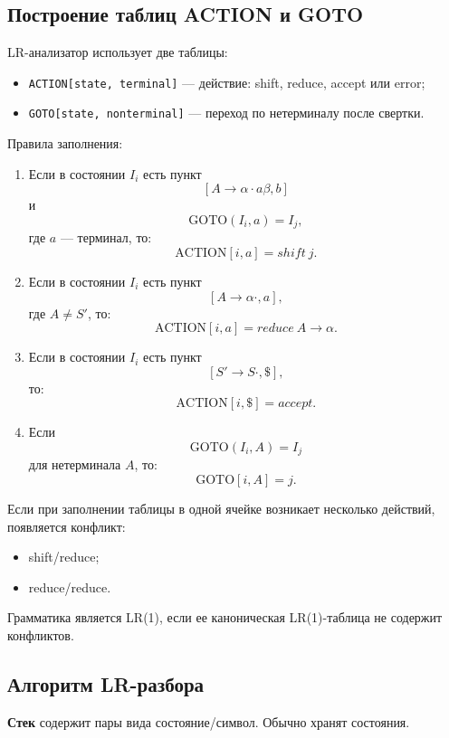 \documentclass[12pt,a4paper]{article}
\begin{document}
\subsection{Построение таблиц ACTION и GOTO}

LR-анализатор использует две таблицы:

\begin{itemize}
    \item \texttt{ACTION[state, terminal]} --- действие: shift, reduce, accept или error;
    \item \texttt{GOTO[state, nonterminal]} --- переход по нетерминалу после свертки.
\end{itemize}

Правила заполнения:

\begin{enumerate}
    \item Если в состоянии $I_i$ есть пункт
    \[
    [A \to \alpha \cdot a\beta, b]
    \]
    и
    \[
    \mathrm{GOTO}(I_i,a)=I_j,
    \]
    где $a$ --- терминал, то:
    \[
    \mathrm{ACTION}[i,a]=shift\ j.
    \]
    \item Если в состоянии $I_i$ есть пункт
    \[
    [A \to \alpha \cdot, a],
    \]
    где $A\ne S'$, то:
    \[
    \mathrm{ACTION}[i,a]=reduce\ A\to \alpha.
    \]
    \item Если в состоянии $I_i$ есть пункт
    \[
    [S'\to S\cdot,\$],
    \]
    то:
    \[
    \mathrm{ACTION}[i,\$]=accept.
    \]
    \item Если
    \[
    \mathrm{GOTO}(I_i,A)=I_j
    \]
    для нетерминала $A$, то:
    \[
    \mathrm{GOTO}[i,A]=j.
    \]
\end{enumerate}

Если при заполнении таблицы в одной ячейке возникает несколько действий, появляется конфликт:

\begin{itemize}
    \item shift/reduce;
    \item reduce/reduce.
\end{itemize}

Грамматика является LR(1), если ее каноническая LR(1)-таблица не содержит конфликтов.

\subsection{Алгоритм LR-разбора}

\textbf{Стек} содержит пары вида состояние/символ. Обычно хранят состояния.
\end{document}

